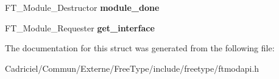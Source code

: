 \begin{DoxyCompactItemize}
\item 
\hypertarget{struct_f_t___module___class___ab6e9c780519e24a51144df79692cf339}{F\-T\-\_\-\-Module\-\_\-\-Destructor {\bfseries module\-\_\-done}}\label{struct_f_t___module___class___ab6e9c780519e24a51144df79692cf339}

\item 
\hypertarget{struct_f_t___module___class___aa72d79fcd0991231e24e88f359244e8e}{F\-T\-\_\-\-Module\-\_\-\-Requester {\bfseries get\-\_\-interface}}\label{struct_f_t___module___class___aa72d79fcd0991231e24e88f359244e8e}

\end{DoxyCompactItemize}


The documentation for this struct was generated from the following file\-:\begin{DoxyCompactItemize}
\item 
Cadriciel/\-Commun/\-Externe/\-Free\-Type/include/freetype/ftmodapi.\-h\end{DoxyCompactItemize}
